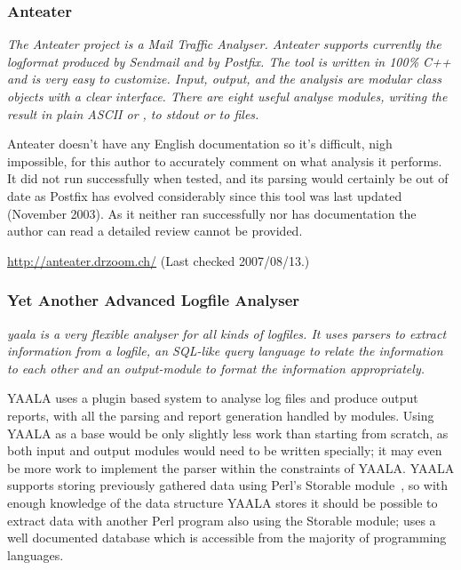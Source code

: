 \subsubsection{Anteater}

\textit{The Anteater project is a Mail Traffic Analyser. Anteater supports
currently the logformat produced by Sendmail and by Postfix. The tool is
written in 100\% C++ and is very easy to customize. Input, output, and the
analysis are modular class objects with a clear interface. There are eight
useful analyse modules, writing the result in plain ASCII or \HTML{}, to
stdout or to files.\/}

Anteater doesn't have any English documentation so it's difficult, nigh
impossible, for this author to accurately comment on what analysis it
performs.  It did not run successfully when tested, and its parsing would
certainly be out of date as Postfix has evolved considerably since this
tool was last updated (November 2003).  As it neither ran successfully nor
has documentation the author can read a detailed review cannot be provided.

\url{http://anteater.drzoom.ch/} \newline (Last checked 2007/08/13.)

\subsubsection{Yet Another Advanced Logfile Analyser}

\textit{yaala is a very flexible analyser for all kinds of logfiles. It
uses parsers to extract information from a logfile, an SQL-like query
language to relate the information to each other and an output-module to
format the information appropriately.\/}

YAALA uses a plugin based system to analyse log files and produce \HTML{}
output reports, with all the parsing and report generation handled by
modules.  Using YAALA as a base would be only slightly less work than
starting from scratch, as both input and output modules would need to be
written specially; it may even be more work to implement the parser within
the constraints of YAALA\@.  YAALA supports storing previously gathered
data using Perl's Storable module~\cite{perl-storable}, so with enough
knowledge of the data structure YAALA stores it should be possible to
extract data with another Perl program also using the Storable module;
\parsername{} uses a well documented database which is accessible from the
majority of programming languages.


